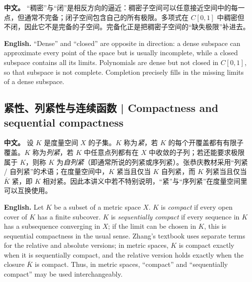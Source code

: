 \documentclass[UTF8,11pt,a4paper]{ctexart}
\newcommand{\APS}[2]{\par\noindent\textbf{中文。} #1\par\noindent\textbf{English.} #2\par\smallskip}
\begin{document}
\APS{“稠密”与“闭”是相反方向的逼近：稠密子空间可以任意接近空间中的每一点，但通常不完备；闭子空间包含自己的所有极限。多项式在 $C[0,1]$ 中稠密但不闭，因此它不是完备的子空间。完备化正是把稠密子空间的“缺失极限”补进去。}{``Dense'' and ``closed'' are opposite in direction: a dense subspace can approximate every point of the space but is usually incomplete, while a closed subspace contains all its limits. Polynomials are dense but not closed in $C[0,1]$, so that subspace is not complete. Completion precisely fills in the missing limits of a dense subspace.}

\subsection{紧性、列紧性与连续函数 | Compactness and sequential compactness}
\APS{设 $K$ 是度量空间 $X$ 的子集。$K$ 称为\emph{紧}，若 $K$ 的每个开覆盖都有有限子覆盖。$K$ 称为\emph{列紧}，若 $K$ 中任意点列都有在 $X$ 中收敛的子列；若还能要求极限属于 $K$，则称 $K$ 为\emph{自列紧}（即通常所说的列紧或序列紧）。张恭庆教材采用“列紧 / 自列紧”的术语；在度量空间中，$K$ 紧当且仅当 $K$ 自列紧，而 $K$ 列紧当且仅当 $\overline K$ 紧，即 $K$ 相对紧。因此本讲义中若不特别说明，“紧”与“序列紧”在度量空间里可以互换使用。}{Let $K$ be a subset of a metric space $X$. $K$ is \emph{compact} if every open cover of $K$ has a finite subcover. $K$ is \emph{sequentially compact} if every sequence in $K$ has a subsequence converging in $X$; if the limit can be chosen in $K$, this is sequential compactness in the usual sense. Zhang's textbook uses separate terms for the relative and absolute versions; in metric spaces, $K$ is compact exactly when it is sequentially compact, and the relative version holds exactly when the closure $\overline K$ is compact. Thus, in metric spaces, ``compact'' and ``sequentially compact'' may be used interchangeably.}
\end{document}
